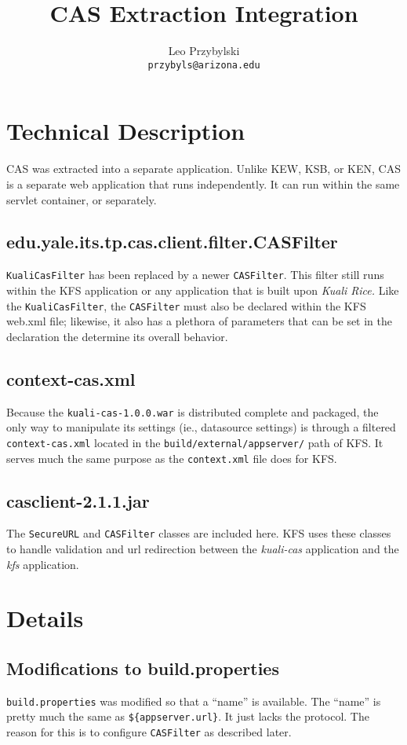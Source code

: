 \documentclass[12pt,notitlepage]{article}
\author{Leo Przybylski \\
\texttt{przybyls@arizona.edu}}
\title{CAS Extraction Integration}
\begin{document}
\maketitle

\lstset{basicstyle=\small,
  breaklines=true,
  includerangemarker=false}
\section{Technical Description}
CAS was extracted into a separate application. Unlike KEW, KSB, or KEN, CAS is a separate web 
application that runs independently. It can run within the same servlet container, or separately.

\subsection{edu.yale.its.tp.cas.client.filter.CASFilter}
\verb|KualiCasFilter| has been replaced by a newer \verb|CASFilter|. 
This filter still runs within the KFS application or any application that is built upon \emph{Kuali Rice.}
Like the \verb|KualiCasFilter|, the \verb|CASFilter| must also be declared within the KFS web.xml file; 
likewise, it also has a plethora of parameters that can be set in the declaration the determine its
overall behavior.

\subsection{context-cas.xml}
Because the \verb|kuali-cas-1.0.0.war| is distributed complete and packaged, the only way to manipulate
its settings (ie., datasource settings) is through a filtered \verb|context-cas.xml| located in the 
\verb|build/external/appserver/| path of KFS. It serves much the same purpose as the \verb|context.xml| 
file does for KFS.

\subsection{casclient-2.1.1.jar}
The \verb|SecureURL| and \verb|CASFilter| classes are included here. KFS uses these classes to handle validation
and url redirection between the \emph{kuali-cas} application and the \emph{kfs} application.

\section{Details}
\subsection{Modifications to build.properties}
\verb|build.properties| was modified so that a ``name'' is available. The ``name'' is pretty much the
same as \verb|${appserver.url}|. It just lacks the protocol. The reason for this is to configure \verb|CASFilter|
as described later.
\end{document}
